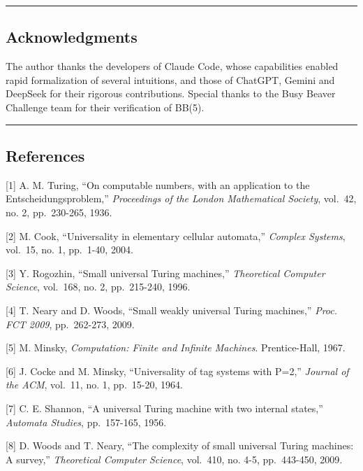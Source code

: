\documentclass[
  11pt,
]{article}
\begin{document}
\begin{center}\rule{0.5\linewidth}{0.5pt}\end{center}

\hypertarget{acknowledgments}{%
\subsection{Acknowledgments}\label{acknowledgments}}

The author thanks the developers of Claude Code, whose capabilities enabled rapid formalization of several intuitions, and those of ChatGPT, Gemini and DeepSeek for their rigorous contributions. Special thanks to the Busy Beaver Challenge team for their verification of BB(5).

\begin{center}\rule{0.5\linewidth}{0.5pt}\end{center}

\hypertarget{references}{%
\subsection{References}\label{references}}

{[}1{]} A. M. Turing, ``On computable numbers, with an application to
the Entscheidungsproblem,'' \emph{Proceedings of the London Mathematical
Society}, vol.~42, no. 2, pp.~230-265, 1936.

{[}2{]} M. Cook, ``Universality in elementary cellular automata,''
\emph{Complex Systems}, vol.~15, no. 1, pp.~1-40, 2004.

{[}3{]} Y. Rogozhin, ``Small universal Turing machines,''
\emph{Theoretical Computer Science}, vol.~168, no. 2, pp.~215-240, 1996.

{[}4{]} T. Neary and D. Woods, ``Small weakly universal Turing
machines,'' \emph{Proc. FCT 2009}, pp.~262-273, 2009.

{[}5{]} M. Minsky, \emph{Computation: Finite and Infinite Machines}.
Prentice-Hall, 1967.

{[}6{]} J. Cocke and M. Minsky, ``Universality of tag systems with
P=2,'' \emph{Journal of the ACM}, vol.~11, no. 1, pp.~15-20, 1964.

{[}7{]} C. E. Shannon, ``A universal Turing machine with two internal
states,'' \emph{Automata Studies}, pp.~157-165, 1956.

{[}8{]} D. Woods and T. Neary, ``The complexity of small universal
Turing machines: A survey,'' \emph{Theoretical Computer Science},
vol.~410, no. 4-5, pp.~443-450, 2009.
\end{document}
